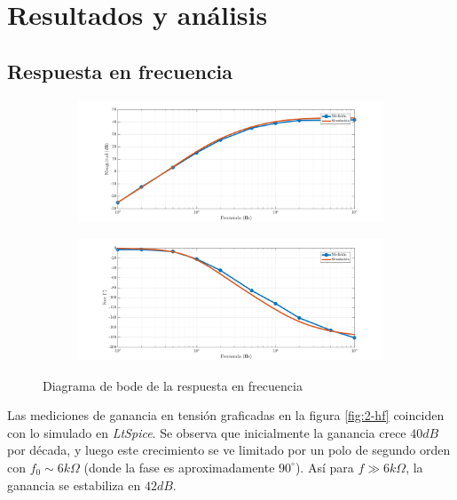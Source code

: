 \documentclass[../../e1_tp1_main.tex]{subfiles}
\begin{document}
\section{Resultados y an\'alisis}

\subsection{Respuesta en frecuencia}


\begin{figure} [H]
	\centering
	\label{fig:2-hf}
	\begin{subfigure}[c]{\textwidth}
		\centering
		\includegraphics[scale=0.65]{imagenes/e1_tp1_ej2_hf_mag.png}
	\end{subfigure}
	
	
	\begin{subfigure}[c]{\textwidth}
		\centering
		\includegraphics[scale=0.65]{imagenes/e1_tp1_ej2_hf_fase.png}
	\end{subfigure}
	
	\caption{Diagrama de bode de la respuesta en frecuencia}
\end{figure}

Las mediciones de ganancia en tensi\'on graficadas en la figura \ref{fig:2-hf} coinciden con lo simulado en \textit{LtSpice}. Se observa que inicialmente la ganancia crece $40dB$ por d\'ecada, y luego este crecimiento se ve limitado por un polo de segundo orden con $f_0 \sim 6k\Omega$ (donde la fase es aproximadamente $90^\circ$). As\'i para $f\gg 6k\Omega$, la ganancia se estabiliza en $42dB$. \par
\end{document}
